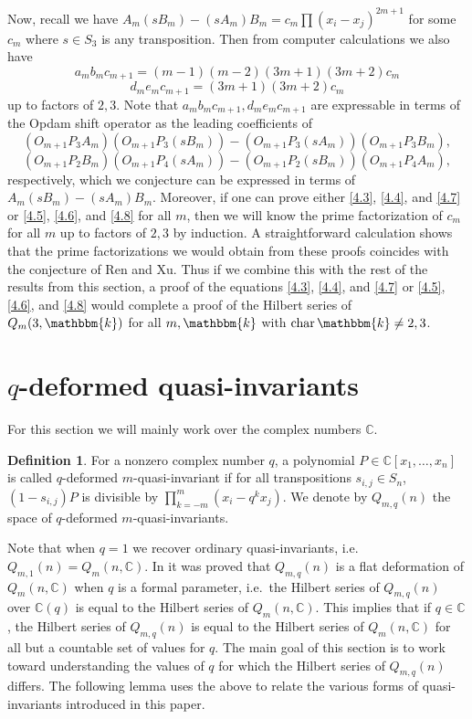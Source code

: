 \documentclass[11pt]{article}
\theoremstyle{definition}
\newtheorem{definition}[theorem]{Definition}
\renewcommand{\k}{\mathbbm{k}}
\renewcommand{\char}{\text{char\,}}
\newcommand{\C}{\mathbb{C}}
\begin{document}
Now, recall we have $A_m(sB_m)-(sA_m)B_m=c_m\prod(x_i-x_j)^{2m+1}$ for some $c_m$ where $s\in S_3$ is any transposition. Then from computer calculations we also have
\begin{equation}\label{4.7}
    a_mb_mc_{m+1}=(m-1)(m-2)(3m+1)(3m+2)c_m\tag{4.7}
\end{equation}
\begin{equation}\label{4.8}
    d_me_mc_{m+1}=(3m+1)(3m+2)c_m\tag{4.8}
\end{equation}
up to factors of $2,3$. Note that $a_mb_mc_{m+1},d_me_mc_{m+1}$ are expressable in terms of the Opdam shift operator as the leading coefficients of
$$(O_{m+1}P_3A_m)(O_{m+1}P_3(sB_m))-(O_{m+1}P_3(sA_m))(O_{m+1}P_3B_m),$$$$(O_{m+1}P_2B_m)(O_{m+1}P_4(sA_m))-(O_{m+1}P_2(sB_m))(O_{m+1}P_4A_m),$$
respectively, which we conjecture can be expressed in terms of $A_m(sB_m)-(sA_m)B_m$. Moreover, if one can prove either \ref{4.3}, \ref{4.4}, and \ref{4.7} or \ref{4.5}, \ref{4.6}, and \ref{4.8} for all $m$, then we will know the prime factorization of $c_m$ for all $m$ up to factors of $2,3$ by induction. A straightforward calculation shows that the prime factorizations we would obtain from these proofs coincides with the conjecture of Ren and Xu. Thus if we combine this with the rest of the results from this section, a proof of the equations \ref{4.3}, \ref{4.4}, and \ref{4.7} or \ref{4.5}, \ref{4.6}, and \ref{4.8} would complete a proof of the Hilbert series of $
Q_m(3,\k)$ for all $m,\k$ with $\char\k\neq 2,3$.
\section{$q$-deformed quasi-invariants}\label{sec:5}

For this section we will mainly work over the complex numbers $\C$.

\begin{definition}
    For a nonzero complex number $q$, a polynomial $P\in\C[x_1,\dots,x_n]$ is called \linebreak
    $q$-deformed $m$-quasi-invariant if for all transpositions $s_{i,j}\in S_n$, $(1-s_{i,j})P$ is divisible by \linebreak
    $\prod_{k=-m}^m(x_i-q^kx_j)$. We denote by $Q_{m,q}(n)$ the space of $q$-deformed $m$-quasi-invariants.
\end{definition}

Note that when $q=1$ we recover ordinary quasi-invariants, i.e.~$Q_{m,1}(n)=Q_m(n,\C)$. In \cite{BEF} it was proved that $Q_{m,q}(n)$ is a flat deformation of $Q_m(n,\C)$ when $q$ is a formal parameter, i.e.~the Hilbert series of $Q_{m,q}(n)$ over $\C(q)$ is equal to the Hilbert series of $Q_m(n,\C)$. This implies that if $q\in\C$, the Hilbert series of $Q_{m,q}(n)$ is equal to the Hilbert series of $Q_m(n,\C)$ for all but a countable set of values for $q$. The main goal of this section is to work toward understanding the values of $q$ for which the Hilbert series of $Q_{m,q}(n)$ differs. The following lemma uses the above to relate the various forms of quasi-invariants introduced in this paper.
\end{document}
